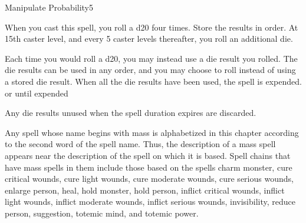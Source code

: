 \begin{spellsection}{Manipulate Probability}{5}
\begin{spellheader}
\end{spellheader}
\begin{spellcontent}
    \begin{spelltargetinginfo}
    \end{spelltargetinginfo}
    \begin{spelleffects}
        \spelleffect When you cast this spell, you roll a d20 four times. Store the results in order. At 15th caster level, and every 5 caster levels thereafter, you roll an additional die.

        Each time you would roll a d20, you may instead use a die result you rolled. The die results can be used in any order, and you may choose to roll instead of using a stored die result. When all the die results have been used, the spell is expended.
        \spelldur \durshort or until expended
    \end{spelleffects}
\end{spellcontent}
\begin{spellfooter}
    \spellnotes Any die results unused when the spell duration expires are discarded.
\end{spellfooter}

\par Any spell whose name begins with mass is alphabetized in this chapter according to the second word of the spell name. Thus, the description of a mass spell appears near the description of the spell on which it is based. Spell chains that have mass spells in them include those based on the spells charm monster, cure critical wounds, cure light wounds, cure moderate wounds, cure serious wounds, enlarge person, heal, hold monster, hold person, inflict critical wounds, inflict light wounds, inflict moderate wounds, inflict serious wounds, invisibility, reduce person, suggestion, totemic mind, and totemic power.
\end{spellsection}

